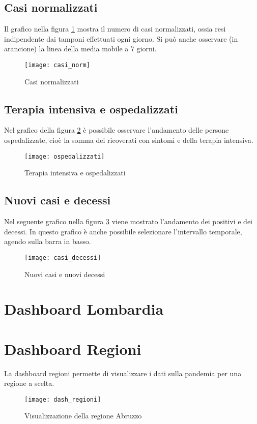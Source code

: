 \subsection{Casi normalizzati}
Il grafico nella figura \ref{fig:casi_normalizzati} mostra il numero di casi normalizzati, ossia resi indipendente dai tamponi effettuati ogni giorno.
Si può anche osservare (in arancione) la linea della media mobile a 7 giorni.
\begin{figure}[htp]
    \centering
    \texttt{[image: casi\_norm]}
    \caption{Casi normalizzati}
    \label{fig:casi_normalizzati}
\end{figure}

\subsection{Terapia intensiva e ospedalizzati}
Nel grafico della figura \ref{fig:ti_ospdedalizzati} è possibile osservare l'andamento delle persone ospedalizzate, cioè la somma dei ricoverati con sintomi e della terapia intensiva.
\begin{figure}[htp]
    \centering
    \texttt{[image: ospedalizzati]}
    \caption{Terapia intensiva e ospedalizzati}
    \label{fig:ti_ospdedalizzati}
\end{figure}


\subsection{Nuovi casi e decessi}
Nel seguente grafico nella figura \ref{fig:casi_decessi} viene mostrato l'andamento dei positivi e dei decessi.
In questo grafico è anche possibile selezionare l'intervallo temporale, agendo sulla barra in basso.
\begin{figure}[htp]
    \centering
    \texttt{[image: casi\_decessi]}
    \caption{Nuovi casi e nuovi decessi}
    \label{fig:casi_decessi}
\end{figure}

\section{Dashboard Lombardia}

\section{Dashboard Regioni}
La dashboard regioni permette di visualizzare i dati sulla pandemia per una regione a scelta.

\begin{figure}[htp]
    \centering
    \texttt{[image: dash\_regioni]}
    \caption{Visualizzazione della regione Abruzzo}
    \label{fig:dash_regioni}
\end{figure}


